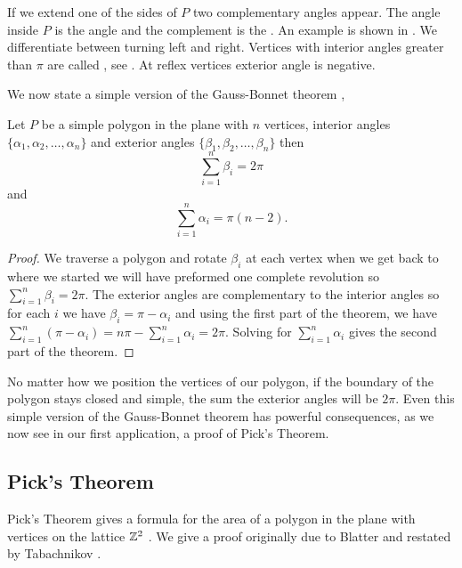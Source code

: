 If we extend one of the sides of $P$ two complementary angles appear.
The angle inside $P$ is the  angle and the complement 
is the  . An example is shown in .
We differentiate between turning left and right.
Vertices with interior angles  greater than $\pi$ are called , see . 
At reflex vertices exterior angle is negative.



We now state a simple version of the Gauss-Bonnet theorem \cite{gottlieb_all_1996,polya_elementary_1954},

\begin{theorem}\label{thm:simple-bonnet}
Let $P$ be a simple polygon in the plane with $n$  vertices,
interior angles $\{\alpha_1,\alpha_2,\ldots,\alpha_n\}$
and exterior angles $\{\beta_1,\beta_2,\ldots,\beta_n\}$ then
$$\sum_{i=1}^n\beta_i=2\pi$$
and 
$$\sum_{i=1}^n\alpha_i=\pi(n-2).$$
\end{theorem}


\begin{proof}

	We traverse a polygon and rotate $\beta_i$ at each vertex
	when we get back to where we started we will have preformed 
	one complete revolution so $\sum_{i=1}^n\beta_i=2\pi.$
	The exterior angles are complementary to the interior angles
	so for each $i$ we have $\beta_i=\pi-\alpha_i$  and using the first
	part of the theorem,  we have
	$\sum_{i=1}^n(\pi-\alpha_i)=n\pi -\sum_{i=1}^n\alpha_i=2\pi$. 
	Solving for $\sum_{i=1}^n\alpha_i$ gives the second part of the theorem.

\end{proof}
No matter how we position the vertices of our polygon,
if the boundary of the polygon stays closed and simple,
the sum the exterior angles will be $2\pi$.
Even this simple version of the Gauss-Bonnet theorem has powerful
consequences, as we now see in our first application, a proof of Pick's Theorem.





\subsection{Pick's Theorem}
\label{sec:pick}

Pick's Theorem gives a formula for the area of a polygon
in the plane with vertices on the lattice $\mathbb{Z}^2$ \cite{og-pick}.
We give a proof originally due to Blatter \cite{blatter_another_1997}
and restated by Tabachnikov  \cite{tabachnikov_proofs_2014}.

